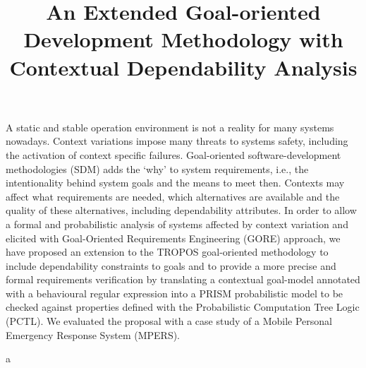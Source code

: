 \documentclass[mestrado]{unb-cic}
\title{An Extended Goal-oriented Development Methodology with Contextual Dependability Analysis}%
\begin{document}
  \maketitle

  \begin{dedicatoria}

  \end{dedicatoria}

  \begin{agradecimentos}

  \end{agradecimentos}


  \begin{resumo}
  A static and stable operation environment is not a reality for many systems nowadays. Context variations impose many threats to systems safety, including the activation of context specific failures. Goal-oriented software-development methodologies (SDM) adds the `why' to system requirements, i.e., the intentionality behind system goals and the means to meet then. Contexts may affect what requirements are needed, which alternatives are available and the quality of these alternatives, including dependability attributes. In order to allow a formal and probabilistic analysis of systems affected by context variation and elicited with Goal-Oriented Requirements Engineering (GORE) approach, we have proposed an extension to the TROPOS goal-oriented methodology to include dependability constraints to goals and to provide a more precise and formal requirements verification by translating a contextual goal-model annotated with a behavioural regular expression into a PRISM probabilistic model to be checked against properties defined with the Probabilistic Computation Tree Logic (PCTL). We evaluated the proposal with a case study of a Mobile Personal Emergency Response System (MPERS).
  
  
  \end{resumo}

  a
  \begin{abstract}
  	
  \end{abstract}
  \tableofcontents
  \listoffigures
  \listoftables

\renewcommand{\appendixname}{Anexo}


  \textual
  
  
  
  
    
      
  
  

  \postextual
  
  

\appendix
\end{document}
